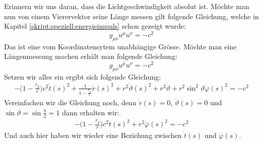 \begin{refsection}
Erinnern wir uns daran, dass die Lichtgeschwindigkeit absolut ist. Möchte man nun von einem Vierervektor seine Länge messen gilt folgende Gleichung, welche in Kapitel \ref{skript:speziell:energieimpuls} schon gezeigt wurde:
\begin{equation}
g_{\mu\nu}u^\mu u^\nu=-c^2 
\end{equation}
Das ist eine vom Koordinatensytem unabhängige Grösse. Möchte man eine Längenmessung machen erhält man folgende Gleichung:
\begin{equation}
g_{\mu\nu}u^\mu u^\nu = -c^2
\end{equation}
Setzen wir alles ein ergibt sich folgende Gleichung:
\begin{align*}
-\biggl(1-\frac{r_g}r\biggr)c^2 \dot t(s)^2 +  \frac1{\displaystyle 1-\frac{r_g}r} \dot r(s)^2 + r^2 \dot \vartheta(s)^2 + r^2 \dot \vartheta + r^2 \sin^2 \vartheta \dot \varphi (s)^2 = -c^2
\end{align*}
Vereinfachen wir die Gleichung noch, denn \( \dot r(s) = 0 \), \( \dot \vartheta(s) = 0 \) und \( \sin \vartheta = \sin \frac{\pi}{2} = 1 \) dann erhalten wir:
\begin{align*}
-\biggl(1-\frac{r_g}r\biggr)c^2 \dot t(s)^2 + r^2  \dot \varphi (s)^2 = -c^2 
\end{align*}
Und auch hier haben wir wieder eine Beziehung zwischen \( \dot t(s) \) und \( \dot \varphi(s) \). 


\end{refsection}
